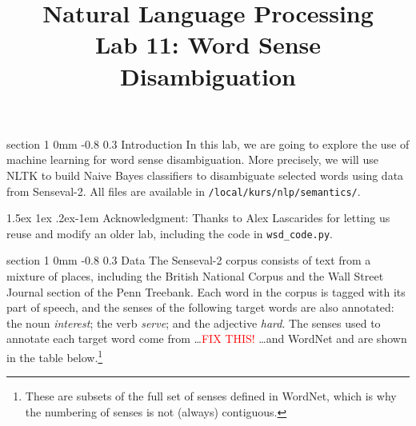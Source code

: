 \documentclass[11pt]{article}
\title{{\LARGE Natural Language Processing}\\[1.5mm]{\large Lab 11: Word Sense Disambiguation}}
\author{}
\date{} %
\makeatletter
\newcommand{\newsec}[2]{\section{#1}\label{sec:#2}\noindent}
\renewcommand{\section}{\@startsection
{section}%
{1}%
{0mm}%
{-0.8\baselineskip}%
{0.3\baselineskip}%
{\bfseries\large}}%
\renewcommand{\paragraph}{%
  \@startsection{paragraph}{4}%
  {\z@}{1.5ex \@plus 1ex \@minus .2ex}{-1em}%
  {\normalfont\normalsize\bfseries}%
}\makeatother
\makeatother
\begin{document}
 

\maketitle
\vspace{-2mm}
\newsec{Introduction}{intro}%
In this lab, we are going to explore the use of machine learning for word sense disambiguation.
More precisely, we will use NLTK to build Naive Bayes classifiers to disambiguate selected words
using data from Senseval-2. All files are available in {\tt /local/kurs/nlp/semantics/}.

\paragraph{Acknowledgment:} Thanks to Alex Lascarides for letting us reuse
and modify an older lab, including the code in {\tt wsd\_code.py}.

\newsec{Data}{data}%
The Senseval-2 corpus consists of text from a mixture of places, including the British National Corpus and the Wall Street Journal section of the Penn Treebank. Each word in the corpus is tagged with its part of speech, and the senses of the following target words are also annotated: the noun {\em interest}; the verb {\em serve}; and the adjective {\em hard}. The senses used to annotate each target word come from \ldots \textcolor{red}{FIX THIS!} \ldots and WordNet and are shown in the table below.\footnote{These are subsets of the full set of senses defined in WordNet,
which is why the numbering of senses is not (always) contiguous.}
\end{document}
